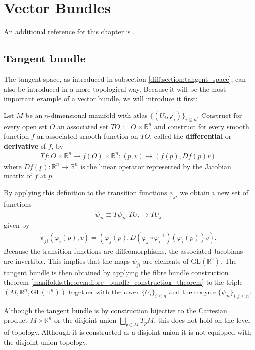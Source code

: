 \chapter{Vector Bundles}\label{chapter:vector_bundles}

    An additional reference for this chapter is \cite{bott_tu}.

\section{Tangent bundle}

    The tangent space, as introduced in subsection \ref{diff:section:tangent_space}, can also be introduced in a more topological way. Because it will be the most important example of a vector bundle, we will introduce it first:
    \begin{construct}
        Let $M$ be an $n$-dimensional manifold with atlas $\{(U_i, \varphi_i)\}_{i\leq n}$. Construct for every open set $O$ an associated set $TO := O\times\mathbb{R}^n$ and construct for every smooth function $f$ an associated smooth function on $TO$, called the \textbf{differential} or \textbf{derivative} of $f$, by
        \begin{gather}
            \label{diff:manifolds:T_function}
            Tf:O\times\mathbb{R}^n\rightarrow f(O)\times\mathbb{R}^n:(p, v)\mapsto(f(p), Df(p)v)
        \end{gather}
        where $Df(p):\mathbb{R}^n\rightarrow\mathbb{R}^n$ is the linear operator represented by the Jacobian matrix of $f$ at $p$.

        By applying this definition to the transition functions $\psi_{ji}$ we obtain a new set of functions \[\widetilde{\psi}_{ji} \equiv T\psi_{ji}:TU_i\rightarrow TU_j\] given by
        \begin{gather}
            \widetilde{\psi}_{ji}(\varphi_i(p), v) = \left(\varphi_j(p), D(\varphi_j\circ\varphi_i^{-1})(\varphi_i(p))v\right).
        \end{gather}
        Because the transition functions are diffeomorphisms, the associated Jacobians are invertible. This implies that the maps $\widetilde\psi_{ji}$ are elements of $\text{GL}(\mathbb{R}^n)$. The tangent bundle is then obtained by applying the fibre bundle construction theorem \ref{manifolds:theorem:fibre_bundle_construction_theorem} to the triple $(M, \mathbb{R}^n,\text{GL}(\mathbb{R}^n))$ together with the cover $\{U_i\}_{i\leq n}$ and the cocycle $\{\widetilde\psi_{ji}\}_{i,j\leq n}$.
    \end{construct}
    \begin{remark}
        Although the tangent bundle is by construction bijective to the Cartesian product $M\times\mathbb{R}^n$ or the disjoint union $\bigsqcup_{p\in M}T_pM$, this does not hold on the level of topology. Although it is constructed as a disjoint union it is not equipped with the disjoint union topology.
    \end{remark}

